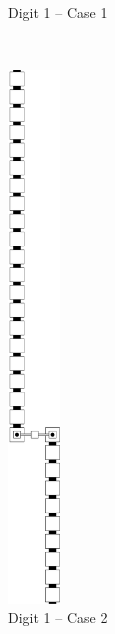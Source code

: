 \begin{itemize}
\begin{figure}[H]
\begin{subfigure}[t]{0.24\textwidth}
                \caption{\label{fig:pre_warp_case1_digit1_msr} Digit 1 -- Case 1}
            \end{subfigure}%
            ~
            \begin{subfigure}[t]{0.24\textwidth}
                \centering
                \includegraphics[width=0.15\textwidth]{warping/pre_warp_case2_digit1_msr}
                \caption{\label{fig:pre_warp_case2_digit1_msr} Digit 1 -- Case 2}
            \end{subfigure}%
            ~
            \begin{subfigure}[t]{0.24\textwidth}
                \centering

\end{subfigure}
\end{figure}
\end{itemize}
